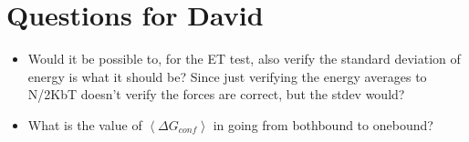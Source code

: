 \documentclass[10pt]{article} %
\begin{document}
\section{Questions for David}
\begin{itemize}
\item Would it be possible to, for the ET test, also verify the standard deviation of energy is what it should be? Since just verifying the energy averages to N/2KbT doesn't verify the forces are correct, but the stdev would?
\item What is the value of $\left<\Delta G_{conf}\right>$ in going from bothbound to onebound?
\end{itemize}
\end{document}
